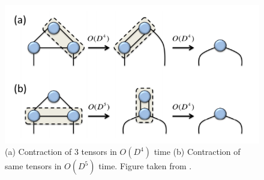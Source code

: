\begin{figure}
    \center
    \includegraphics[width=0.8 \textwidth]{Figuren/tnalgs/contraction_order.png}
    \caption{ (a) Contraction of 3 tensors in $O(D^4)$ time (b) Contraction of same tensors in $O(D^5)$ time. Figure taken from \cite{Orus2014}.  }
    \label{fig:tnalgs:cont_ord}
\end{figure}